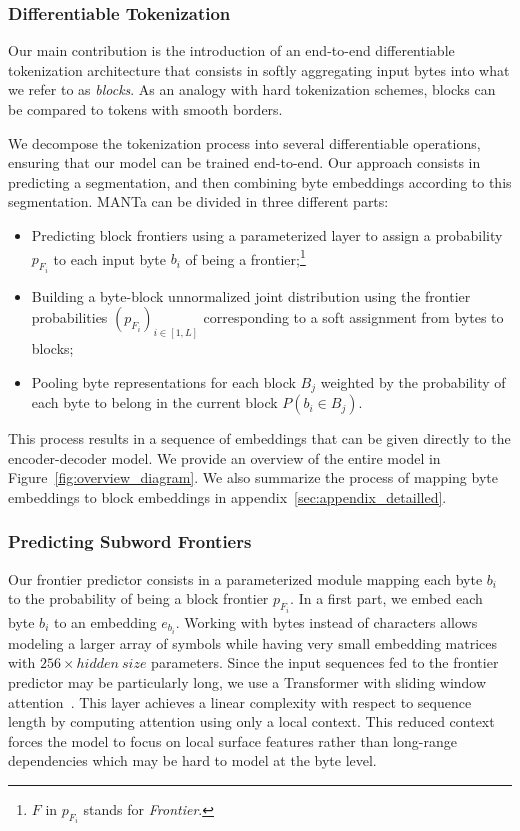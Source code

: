 \subsubsection{Differentiable Tokenization}
\label{sec:differentiable_tokenization}
Our main contribution is the introduction of an end-to-end differentiable tokenization architecture that consists in softly aggregating input bytes into what we refer to as \textit{blocks}. As an analogy with hard tokenization schemes, blocks can be compared to tokens with smooth borders.

We decompose the tokenization process into several differentiable operations, ensuring that our model can be trained end-to-end. Our approach consists in predicting a segmentation, and then combining byte embeddings according to this segmentation. MANTa can be divided in three different parts:
\begin{itemize}
    \item Predicting block frontiers using a parameterized layer to assign a probability $p_{F_i}$ to each input byte $b_i$ of being a frontier;\footnote{$F$ in $p_{F_i}$ stands for \textit{Frontier}.}
    \item Building a byte-block unnormalized joint distribution using the frontier probabilities $(p_{F_i})_{i \in [1, L]}$ corresponding to a soft assignment from bytes to blocks;
    \item Pooling byte representations for each block $B_j$ weighted by the probability of each byte to belong in the current block $P(b_i \in B_j)$.
\end{itemize}

This process results in a sequence of embeddings that can be given directly to the encoder-decoder model. We provide an overview of the entire model in Figure~\ref{fig:overview_diagram}. We also summarize the process of mapping byte embeddings to block embeddings in appendix~\ref{sec:appendix_detailled}.

\subsubsection{Predicting Subword Frontiers}
\label{sec:frontpred}
Our frontier predictor consists in a parameterized module mapping each byte $b_i$ to the probability of being a block frontier $p_{F_i}$. In a first part, we embed each byte $b_i$ to an embedding $e_{b_i}$. Working with bytes instead of characters allows modeling a larger array of symbols while having very small embedding matrices with $256\times hidden\ size$ parameters. Since the input sequences fed to the frontier predictor may be particularly long, we use a Transformer with sliding window attention~\citep{beltagy2020longformer}. This layer achieves a linear complexity with respect to sequence length by computing attention using only a local context. This reduced context forces the model to focus on local surface features rather than long-range dependencies which may be hard to model at the byte level.

